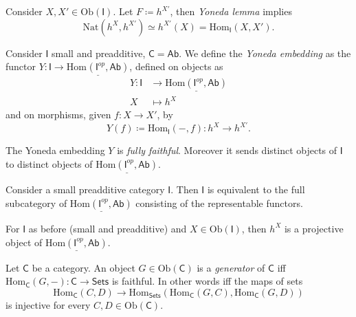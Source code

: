 \begin{rem}
	Consider $X, X' \in \mathrm{Ob} \left(\mathsf{I}\right)$. 
	Let $F \coloneqq h^{X'}$, then {\em Yoneda lemma} implies
	\begin{equation}
		\mathrm{Nat} \left( h^X, h^{X'} \right) \simeq h^{X'}(X) = \mathrm{Hom}_{\mathsf{I}} \left( X, X' \right)
	.\end{equation} 
\end{rem}

\begin{defn}
	Consider $\mathsf{I}$ small and preadditive, $\mathsf{C} = \mathsf{Ab}$.
	We define the {\em Yoneda embedding} as the functor
	$Y\colon \mathsf{I} \to \underline{\mathrm{Hom}_{\mathsf{}} \left( \mathsf{I}^{op}, \mathsf{Ab} \right)}$,
	defined on objects as
	\begin{align}
	Y\colon \mathsf{I} &\to \underline{\mathrm{Hom} \left( \mathsf{I}^{op}, \mathsf{Ab} \right)} \\
		X &\mapsto h^X
	\end{align} 
	and on morphisms, given $f\colon X \to X'$, by
	\begin{equation}
		Y(f)\coloneqq \mathrm{Hom}_{\mathsf{I}} \left( -, f \right)\colon h^X \to h^{X'}
	.\end{equation} 
\end{defn}

\begin{prop}
	The Yoneda embedding $Y$ is {\em fully faithful}.
	Moreover it sends distinct objects of $\mathsf{I}$ to distinct objects of
	$\underline{\mathrm{Hom}\left( \mathsf{I}^{op}, \mathsf{Ab} \right)}$.
\end{prop} 

\begin{cor}
	Consider a small preadditive category $\mathsf{I}$.
	Then $\mathsf{I}$ is equivalent to the full subcategory of
	$\underline{\mathrm{Hom}\left( \mathsf{I}^{op}, \mathsf{Ab} \right)}$ 
	consisting of the representable functors.
\end{cor} 

\begin{prop}
	For $\mathsf{I}$ as before (small and preadditive) and
	$X \in \mathrm{Ob} \left(\mathsf{I}\right)$, then
	$h^X$ is a projective object of 
	$\underline{\mathrm{Hom} \left( \mathsf{I}^{op}, \mathsf{Ab} \right)}$.
\end{prop} 

\begin{defn}
	Let $\mathsf{C}$ be a category.
	An object $G \in \mathrm{Ob} \left(\mathsf{C}\right)$ is a {\em generator} of $\mathsf{C}$ iff
	$\mathrm{Hom}_{\mathsf{C}} \left( G, - \right)\colon \mathsf{C} \to \mathsf{Sets}$ is faithful.
	In other words iff the maps of sets
	 \begin{equation}
	\mathrm{Hom}_{\mathsf{C}} \left( C, D \right) \to
	\mathrm{Hom}_{\mathsf{Sets}} \left( \mathrm{Hom}_{\mathsf{C}} \left( G, C \right), 
	\mathrm{Hom}_{\mathsf{C}} \left( G, D \right) \right)
	\end{equation} 
	is injective for every $C, D \in \mathrm{Ob} \left(\mathsf{C}\right)$.
\end{defn}

